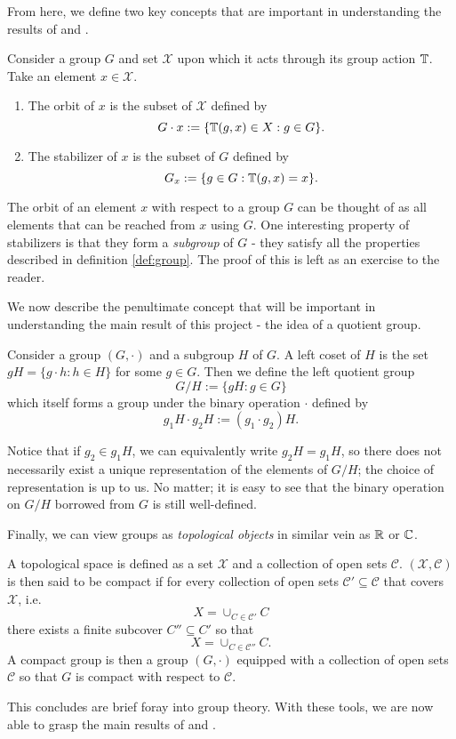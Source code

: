 From here, we define two key concepts that are important in understanding the results of \cite{bloemreddy2019probabilistic} and \cite{kondor2018generalization}.

\begin{definition} \label{def:orbit_stabilizer}
Consider a group $G$ and set $\mathcal{X}$ upon which it acts through its group action $\mathbb{T}$.
Take an element $x \in \mathcal{X}$.
\begin{enumerate}
	\item
	The orbit of $x$ is the subset of $\mathcal{X}$ defined by
	$$
		G \cdot x := \{ \mathbb{T}(g,x) \in X : g \in G \}.
	$$
	\item
	The stabilizer of $x$ is the subset of $G$ defined by
	$$
		G_x := \{ g \in G : \mathbb{T}(g,x) = x \}.
	$$
\end{enumerate}
\end{definition}

The orbit of an element $x$ with respect to a group $G$ can be thought of as all elements that can be reached from $x$ using $G$.
One interesting property of stabilizers is that they form a \textit{subgroup} of $G$ - they satisfy all the properties described in definition \ref{def:group}.
The proof of this is left as an exercise to the reader.

We now describe the penultimate concept that will be important in understanding the main result of this project - the idea of a quotient group.

\begin{definition} \label{def:quotient}
Consider a group $(G,\cdot)$ and a subgroup $H$ of $G$.
A left coset of $H$ is the set $gH = \{g\cdot h: h \in H\}$ for some $g \in G$.
Then we define the left quotient group
$$
	G/H := \{ gH : g \in G \}
$$
which itself forms a group under the binary operation $\cdot$ defined by
$$
	g_1H \cdot g_2H := (g_1 \cdot g_2) H.
$$
\end{definition}
Notice that if $g_2 \in g_1 H$, we can equivalently write $g_2H = g_1H$, so there does not necessarily exist a unique representation of the elements of $G/H$; the choice of representation is up to us.
No matter; it is easy to see that the binary operation on $G/H$ borrowed from $G$ is still well-defined.

Finally, we can view groups as \textit{topological objects} in similar vein as $\mathbb{R}$ or $\mathbb{C}$.
\begin{definition} \label{def:compact}
A topological space is defined as a set $\mathcal{X}$ and a collection of open sets $\mathcal{C}$.
$(\mathcal{X}, \mathcal{C})$ is then said to be compact if for every collection of open sets $\mathcal{C}' \subseteq \mathcal{C}$ that covers $\mathcal{X}$, i.e.
$$
	X = \cup_{C \in \mathcal{C}'} C
$$
there exists a finite subcover $C'' \subseteq C'$ so that
$$
	X = \cup_{C \in \mathcal{C}''} C.
$$
A compact group is then a group $(G,\cdot)$ equipped with a collection of open sets $\mathcal{C}$ so that $G$ is compact with respect to $\mathcal{C}$.
\end{definition}
\noindent
This concludes are brief foray into group theory.
With these tools, we are now able to grasp the main results of \cite{bloemreddy2019probabilistic} and \cite{kondor2018generalization}.

